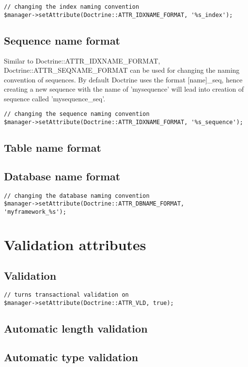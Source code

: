 \documentclass[11pt,a4paper]{report}
\begin{document}
\begin{verbatim}
// changing the index naming convention
$manager->setAttribute(Doctrine::ATTR_IDXNAME_FORMAT, '%s_index');
\end{verbatim}

\subsection{Sequence name format}
Similar to Doctrine::ATTR\_IDXNAME\_FORMAT, Doctrine::ATTR\_SEQNAME\_FORMAT can be used for changing the naming convention of sequences. By default Doctrine uses the format [name]\_seq, hence creating a new sequence with the name of 'mysequence' will lead into creation of sequence called 'mysequence\_seq'.

\begin{verbatim}
// changing the sequence naming convention
$manager->setAttribute(Doctrine::ATTR_IDXNAME_FORMAT, '%s_sequence');
\end{verbatim}

\subsection{Table name format}
\subsection{Database name format}
\begin{verbatim}
// changing the database naming convention
$manager->setAttribute(Doctrine::ATTR_DBNAME_FORMAT, 'myframework_%s');
\end{verbatim}

\section{Validation attributes}
\subsection{Validation}
\begin{verbatim}
// turns transactional validation on
$manager->setAttribute(Doctrine::ATTR_VLD, true);
\end{verbatim}

\subsection{Automatic length validation}
\subsection{Automatic type validation}
\end{document}
